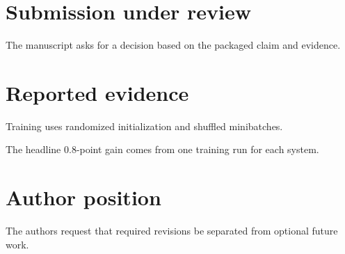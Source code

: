 \documentclass{article}
\begin{document}
\section{Submission under review}
The manuscript asks for a decision based on the packaged claim and evidence.
\section{Reported evidence}
Training uses randomized initialization and shuffled minibatches.

The headline 0.8-point gain comes from one training run for each system.
\section{Author position}
The authors request that required revisions be separated from optional future work.
\end{document}
